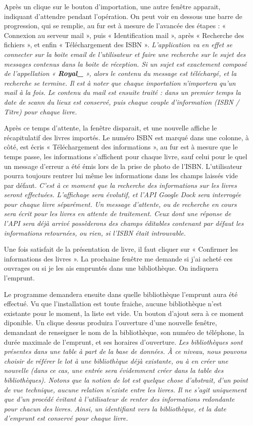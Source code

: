 Après un clique sur le bouton d'importation, 
une autre fenêtre apparait, indiquant d'attendre pendant l'opération. 
On peut voir en dessous une barre de progression, qui se remplie, au fur est à mesure de l'avancée des étapes : 
« Connexion au serveur mail », puis « Identification mail », après « Recherche des fichiers », et enfin « Téléchargement des ISBN ».
\emph{L'application va en effet se connecter sur la boite email de l'utilisateur et faire une recherche sur le sujet des messages contenus dans la boite de réception.
	Si un sujet est exactement composé de l'appellation « \textbf{Royal\_} », alors le contenu du message est téléchargé, et la recherche se termine.
	Il est à noter que chaque importation n'importera qu'un mail à la fois. 
	Le contenu du mail est ensuite traité : dans un premier temps la date de scann du lieux est conservé, puis chaque couple d'information (ISBN \slash{} Titre) pour chaque livre. 
}

Après ce temps d'attente, la fenêtre disparait, et une nouvelle affiche le récapitulatif des livres importés.
Le numéro ISBN est marqué dans une colonne, à côté, est écris « Téléchargement des informations », au fur est à mesure que le temps passe, les informations s'affichent pour chaque livre, sauf celui pour le quel un message d'erreur a été émis lors de la prise de photo de l'ISBN. 
L'utilisateur pourra toujours rentrer lui même les informations dans les champs laissés vide par défaut. 
\emph{C'est à ce moment que la recherche des informations sur les livres seront effectuées. 
	L'affichage sera évolutif, et l'API Google Dock sera interrogée pour chaque livre séparément. 
	Un message d'attente, ou de recherche en cours sera écrit pour les livres en attente de traitement. 
	Ceux dont une réponse de l'API sera déjà arrivé possèderons des champs éditables contenant par défaut les informations retournées, ou rien, si l'ISBN était introuvable. 
}

Une fois satisfait de la présentation de livre, il faut cliquer sur « Confirmer les informations des livres ». 
La prochaine fenêtre me demande si j'ai acheté ces ouvrages ou si je les ais empruntés dans une bibliothèque. 
On indiquera l'emprunt.

Le programme demandera ensuite dans quelle bibliothèque l'emprunt aura été effectué. 
Vu que l'installation est toute fraiche, aucune bibliothèque n'est existante pour le moment, la liste est vide.
Un bouton d'ajout sera à ce moment diponible. 
Un clique dessus produira l'ouverture d'une nouvelle fenêtre, demandant de renseigner le nom de la bibliothèque, son numéro de téléphone, la durée maximale de l'emprunt, et ses horaires d'ouverture. 
\emph{Les bibliothèques sont présentes dans une table à part de la base de données.
	À ce niveau, nous pouvons choisir de référer le lot à une bibliothèque déjà existante, ou à en créer une nouvelle
	(dans ce cas, une entrée sera évidemment créer dans la table des bibliothèques). 
	Notons que la notion de lot est quelque chose d'abstrait, d'un point de vue technique, aucune relation n'existe entre les livres.
	Il ne s'agit uniquement que d'un procédé évitant à l'utilisateur de renter des informations redondante pour chacun des livres.
	Ainsi, un identifiant vers la bibliothèque, et la date d'emprunt est conservé pour chaque livre.
}


